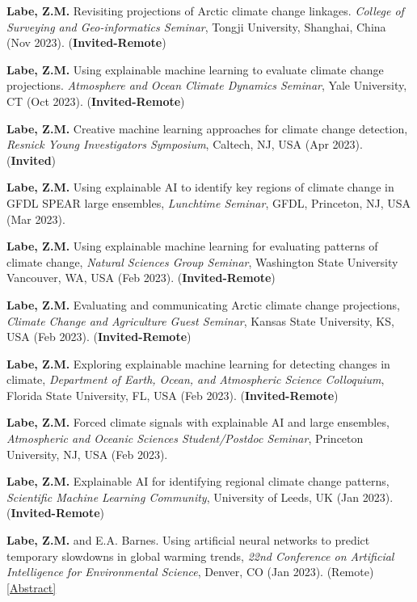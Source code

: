 \documentclass[margin,line,palatino,courier,10pt]{res}
\begin{document}
\begin{resume}
\begin{etaremune}[leftmargin=0in,topsep=0in,parsep=0in]
\item \textbf{Labe, Z.M.} Revisiting projections of Arctic climate change linkages. \textit{College of Surveying and Geo-informatics Seminar}, Tongji University, Shanghai, China (Nov 2023). (\textbf{Invited-Remote})
\item \textbf{Labe, Z.M.} Using explainable machine learning to evaluate climate change projections. \textit{Atmosphere and Ocean Climate Dynamics Seminar}, Yale University, CT (Oct 2023). (\textbf{Invited-Remote}) 
\item \textbf{Labe, Z.M.} Creative machine learning approaches for climate change detection, \textit{Resnick Young Investigators Symposium}, Caltech, NJ, USA (Apr 2023). (\textbf{Invited}) 
\item \textbf{Labe, Z.M.} Using explainable AI to identify key regions of climate change in GFDL SPEAR large ensembles, \textit{Lunchtime Seminar}, GFDL, Princeton, NJ, USA (Mar 2023). 
\item \textbf{Labe, Z.M.} Using explainable machine learning for evaluating patterns of climate change, \textit{Natural Sciences Group Seminar}, Washington State University Vancouver, WA, USA (Feb 2023). (\textbf{Invited-Remote})
\item \textbf{Labe, Z.M.} Evaluating and communicating Arctic climate change projections, \textit{Climate Change and Agriculture Guest Seminar}, Kansas State University, KS, USA (Feb 2023). (\textbf{Invited-Remote})
\item \textbf{Labe, Z.M.} Exploring explainable machine learning for detecting changes in climate, \textit{Department of Earth, Ocean, and Atmospheric Science Colloquium}, Florida State University, FL, USA (Feb 2023). (\textbf{Invited-Remote})
\item \textbf{Labe, Z.M.} Forced climate signals with explainable AI and large ensembles, \textit{Atmospheric and Oceanic Sciences Student/Postdoc Seminar}, Princeton University, NJ, USA (Feb 2023).
\item \textbf{Labe, Z.M.} Explainable AI for identifying regional climate change patterns, \textit{Scientific Machine Learning Community}, University of Leeds, UK (Jan 2023). (\textbf{Invited-Remote})
\item \textbf{Labe, Z.M.} and E.A. Barnes. Using artificial neural networks to predict temporary slowdowns in global warming trends, \textit{22nd Conference on Artificial Intelligence for Environmental Science}, Denver, CO (Jan 2023). (Remote) \href{https://ams.confex.com/ams/103ANNUAL/meetingapp.cgi/Paper/415460}{[Abstract]}

\end{etaremune}
\end{resume}
\end{document}
